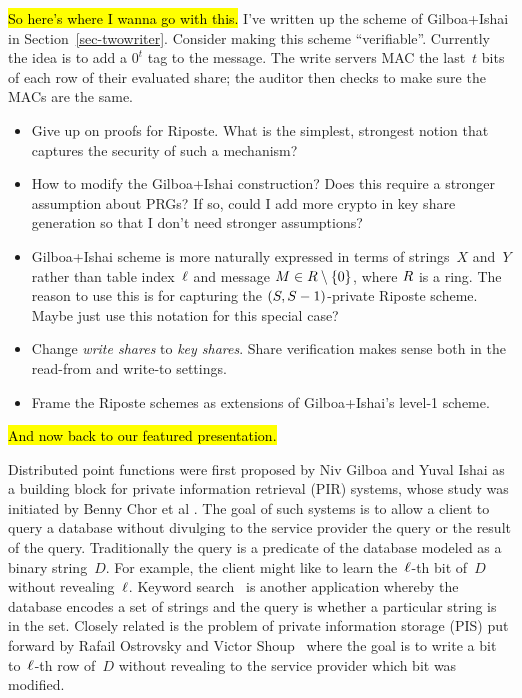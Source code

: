 %
\label{sec-intro}

\hl{So here's where I wanna go with this.}
I've written up the scheme of Gilboa+Ishai in Section~\ref{sec-twowriter}.
Consider making this scheme ``verifiable''. Currently the idea is to add a
$0^t$ tag to the message. The write servers MAC the last~$t$ bits of each row of
their evaluated share; the auditor then checks to make sure the MACs are the same.
\begin{itemize}
  \item Give up on proofs for Riposte. What is the simplest, strongest notion
    that captures the security of such a mechanism?

  \item How to modify the Gilboa+Ishai construction? Does this require a
    stronger assumption about PRGs? If so, could I add more crypto in key share
    generation so that I don't need stronger assumptions?

  \item Gilboa+Ishai scheme is more naturally expressed in terms of strings~$X$
    and~$Y$ rather than table index~$\ell$ and message $M \in R
    \setminus\{0\}$, where $R$ is a ring. The reason to use this is for
    capturing the $(S,S-1)$-private Riposte scheme. Maybe just use
    this notation for this special case?

  \item Change \emph{write shares} to \emph{key shares}. Share verification
    makes sense both in the read-from and write-to settings.

  \item Frame the Riposte schemes as extensions of Gilboa+Ishai's level-1
    scheme.
\end{itemize}
\hl{And now back to our featured presentation.}

Distributed point functions were first proposed by Niv Gilboa and Yuval Ishai
\cite{dpf} as a building block for private information retrieval (PIR) systems,
whose study was initiated by Benny Chor et al \cite{pir}. The goal of such
systems is to allow a client to query a database without divulging to the
service provider the query or the result of the query.
%
Traditionally the query is a predicate of the database modeled as a binary
string~$D$. For example, the client might like to learn the~$\ell$-th bit of~$D$
without revealing~$\ell$.
%
Keyword search~\cite{pir-kws} is another application whereby the database
encodes a set of strings and the query is whether a particular string is in the
set.
%
Closely related is the problem of private information storage (PIS) put forward
by Rafail Ostrovsky and Victor Shoup~\cite{pis} where the goal is to write a bit
to~$\ell$-th row of~$D$ without revealing to the service provider which bit was
modified.

